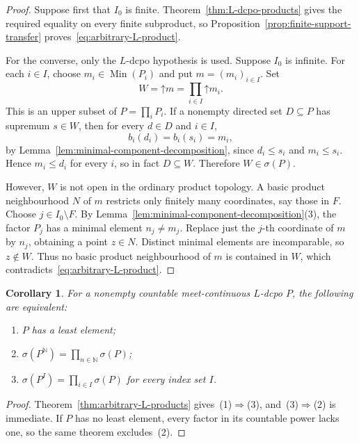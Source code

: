 \documentclass[10pt,a4paper]{amsart}
\newtheorem{corollary}[theorem]{Corollary}
\numberwithin{equation}{section}
\newcommand{\N}{\mathbb N}
\newcommand{\up}[1]{\mathord{\uparrow}#1}
\newcommand{\Sc}{\sigma}
\begin{document}
\begin{proof}
Suppose first that $I_0$ is finite. Theorem~\ref{thm:L-dcpo-products} gives the required equality on every finite subproduct, so Proposition~\ref{prop:finite-support-transfer} proves~\eqref{eq:arbitrary-L-product}.

For the converse, only the $L$-dcpo hypothesis is used. Suppose $I_0$ is infinite. For each $i\in I$, choose $m_i\in\operatorname{Min}(P_i)$ and put $m=(m_i)_{i\in I}$. Set
\begin{equation}\label{eq:minimal-component-product}
 W=\up m=\prod_{i\in I}\up m_i.
\end{equation}
This is an upper subset of $P=\prod_iP_i$. If a nonempty directed set $D\subseteq P$ has supremum $s\in W$, then for every $d\in D$ and $i\in I$,
\[
 b_i(d_i)=b_i(s_i)=m_i,
\]
by Lemma~\ref{lem:minimal-component-decomposition}, since $d_i\le s_i$ and $m_i\le s_i$. Hence $m_i\le d_i$ for every $i$, so in fact $D\subseteq W$. Therefore $W\in\Sc(P)$.

However, $W$ is not open in the ordinary product topology. A basic product neighbourhood $N$ of $m$ restricts only finitely many coordinates, say those in $F$. Choose $j\in I_0\setminus F$. By Lemma~\ref{lem:minimal-component-decomposition}\textup{(3)}, the factor $P_j$ has a minimal element $n_j\ne m_j$. Replace just the $j$-th coordinate of $m$ by $n_j$, obtaining a point $z\in N$. Distinct minimal elements are incomparable, so $z\notin W$. Thus no basic product neighbourhood of $m$ is contained in $W$, which contradicts~\eqref{eq:arbitrary-L-product}.
\end{proof}


\begin{corollary}\label{cor:arbitrary-powers}
For a nonempty countable meet-continuous $L$-dcpo $P$, the following are equivalent:
\begin{enumerate}[label=\textup{(\arabic*)}]
\item $P$ has a least element;
\item $\Sc(P^{\N})=\prod_{n\in\N}\Sc(P)$;
\item $\Sc(P^I)=\prod_{i\in I}\Sc(P)$ for every index set $I$.
\end{enumerate}
\end{corollary}
\begin{proof}
Theorem~\ref{thm:arbitrary-L-products} gives~(1)$\Rightarrow$(3), and~(3)$\Rightarrow$(2) is immediate. If $P$ has no least element, every factor in its countable power lacks one, so the same theorem excludes~(2).
\end{proof}
\end{document}

